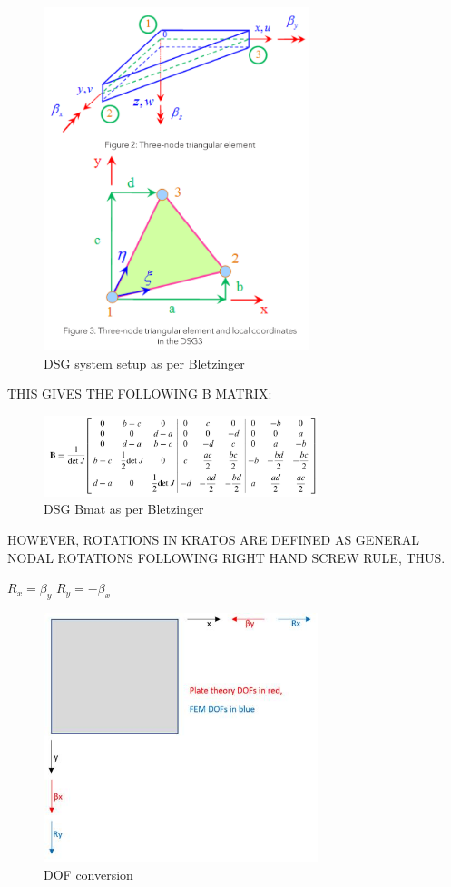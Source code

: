 \begin{figure}[H]
	\centering
	\includegraphics[height=10cm]{images/dsg_derivation_CS_layout2}
	\caption{DSG system setup as per Bletzinger}
	\label{fig:dsgderivationcslayout2}
\end{figure}

THIS GIVES THE FOLLOWING B MATRIX:
\begin{figure}[H]
	\centering
	\includegraphics[width=8cm]{images/dsg_derivation_bletzy_Bmat.png}
	\caption{DSG Bmat as per Bletzinger}
	\label{fig:dsgderivationcslayout3}
\end{figure}


HOWEVER, ROTATIONS IN KRATOS ARE DEFINED AS GENERAL NODAL ROTATIONS FOLLOWING RIGHT HAND SCREW RULE, THUS.

$R_x = \beta_y$
$R_y = -\beta_x$
\begin{figure}[H]
	\centering
	\includegraphics[width=8cm]{images/dsg_derivation_DOF_conversion.png}
	\caption{DOF conversion}
	\label{fig:dsgderivationcslayout4}
\end{figure}

